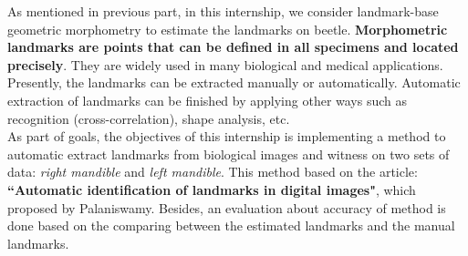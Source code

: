 As mentioned in previous part, in this internship, we consider landmark-base geometric morphometry to estimate the landmarks on beetle. \textbf{Morphometric landmarks are points that can be defined in all specimens  and located precisely}\cite{palaniswamy2010automatic}. They are widely used in many biological and medical applications. Presently, the landmarks can be extracted manually or automatically. Automatic extraction of landmarks can be finished by applying other ways such as recognition (cross-correlation), shape analysis, etc.\\[0.2cm]
As part of goals, the objectives of this internship is implementing a method to automatic extract landmarks from biological images and witness on two sets of data: \textit{right mandible} and \textit{left mandible}. This method based on the article: \textbf{``Automatic identification of landmarks in digital images"}, which proposed by Palaniswamy\cite{palaniswamy2010automatic}. Besides, an evaluation about accuracy of method is done based on the comparing between the estimated landmarks and the manual landmarks.






























